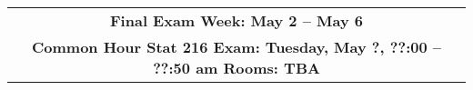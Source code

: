 \begin{center}
\begin{tabular}{|c|c|c|}
  \multicolumn{3}{|c|}{\textbf{Final Exam Week: May 2 -- May 6 }} \\
  \multicolumn{3}{|c|}{\bf{ Common Hour Stat 216  Exam: 
      Tuesday, May ?, ??:00 -- ??:50 am Rooms: TBA}} \\
\hline

\end{tabular}
\vspace{.2in} \\
\end{center}


